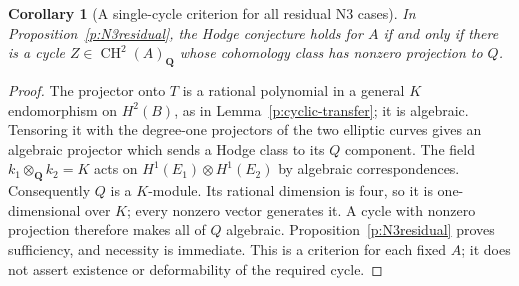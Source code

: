 \documentclass[11pt,reqno]{article}
\theoremstyle{emphasizedplain}
\newtheorem{corollary}[theorem]{Corollary}
\theoremstyle{emphasizeddefinition}
\theoremstyle{emphasizeddefinition}
\DeclareMathOperator{\CH}{CH}
\newcommand{\Q}{\mathbf Q}
\begin{document}
\begin{corollary}[A single-cycle criterion for all residual N3 cases]
\label{p:N3onecycle}
In Proposition~\ref{p:N3residual}, the Hodge conjecture holds for
$A$ if and only if there is a cycle $Z\in\CH^2(A)_\Q$ whose
cohomology class has nonzero projection to $Q$.
\end{corollary}
\begin{proof}
The projector onto $T$ is a rational polynomial in a general
$K$ endomorphism on $H^2(B)$, as in
Lemma~\ref{p:cyclic-transfer}; it is algebraic. Tensoring it with
the degree-one projectors of the two elliptic curves gives an
algebraic projector which sends a Hodge class to its $Q$ component.
The field $k_1\otimes_\Q k_2=K$ acts on
$H^1(E_1)\otimes H^1(E_2)$ by algebraic correspondences.
Consequently $Q$ is a $K$-module. Its rational dimension is four,
so it is one-dimensional over $K$; every nonzero vector generates
it. A cycle with nonzero projection therefore makes all of $Q$
algebraic. Proposition~\ref{p:N3residual} proves sufficiency, and
necessity is immediate. This is a criterion for each fixed $A$;
it does not assert existence or deformability of the required cycle.
\end{proof}
\end{document}
